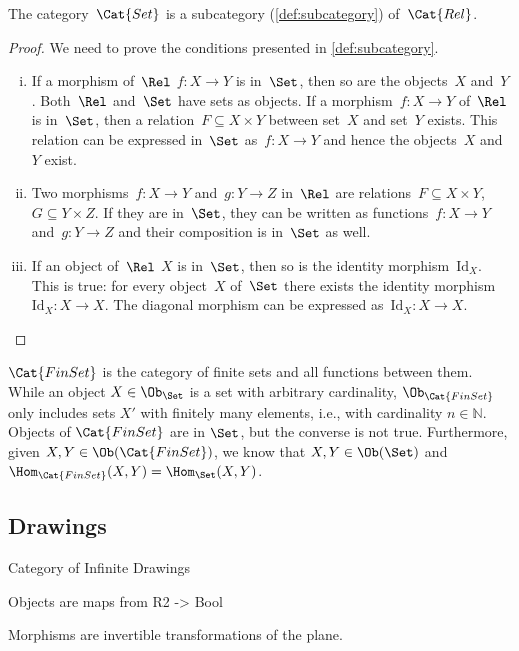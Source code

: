 \begin{lemma}
    The category~$\Cat{Set}$ is a subcategory (\cref{def:subcategory}) of~$\Cat{Rel}$.
\end{lemma}
\begin{proof}
	We need to prove the conditions presented in \cref{def:subcategory}.
	\begin{enumerate}[(i)]
	\item If a morphism of~$\Rel$ $f \colon X\to Y$ is in~$\Set$, then so are the objects~$X$ and~$Y$. Both~$\Rel$ and~$\Set$ have sets as objects. If a morphism~$f\colon X\to Y$ of~$\Rel$ is in~$\Set$, then a relation~$F\subseteq X\times Y$ between set~$X$ and set~$Y$ exists. This relation can be expressed in~$\Set$ as~$f\colon X\to Y$ and hence the objects~$X$ and~$Y$ exist.
	\item Two morphisms~$f\colon X\to Y$ and~$g\colon Y\to Z$ in~$\Rel$ are relations~$F\subseteq X\times Y$,~$G\subseteq Y\times Z$. If they are in~$\Set$, they can be written as functions~$f\colon X\to Y$ and~$g\colon Y\to Z$ and their composition is in~$\Set$ as well. 
	\item If an object of~$\Rel$ $X$ is in~$\Set$, then so is the identity morphism~$\text{Id}_X$. This is true: for every object~$X$ of~$\Set$ there exists the identity morphism~$\text{Id}_X\colon X\to X$. The diagonal morphism can be expressed as~$\text{Id}_X\colon X\to X$.
	\end{enumerate}
\end{proof}

\begin{example}
$\Cat{FinSet}$ is the category of finite sets and all functions between them. While an object $X\in \Ob_\Set$ is a set with arbitrary cardinality, $\Ob_{\Cat{FinSet}}$ only includes sets $X'$ with finitely many elements, i.e., with cardinality $n\in \mathbb{N}$. Objects of $\Cat{FinSet}$ are in $\Set$, but the converse is not true. Furthermore, given $X,Y\in \Ob(\Cat{FinSet})$, we know that $X,Y\in \Ob(\Set)$ and $\Hom_{\Cat{FinSet}}(X,Y)=\Hom_{\Set}(X,Y)$.
\end{example}

\subsection{Drawings}


Category of Infinite Drawings

Objects are maps from R2 -> Bool 

Morphisms are invertible transformations of the plane. 

